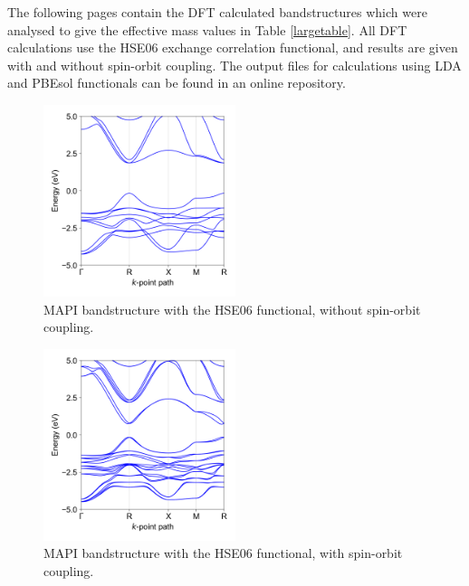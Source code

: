 The following pages contain the DFT calculated bandstructures which were analysed to give the effective mass values in Table \ref{largetable}. All DFT calculations use the HSE06 exchange correlation functional, and results  are given with and without spin-orbit coupling. The output files for calculations using LDA and PBEsol functionals can be found in an online repository.\autocite{Whalley2018b}

\begin{figure}[htb] \centering
\includegraphics[width=0.5\textwidth]{./figures/ap2/MAPI_hybrid.png}
\caption[MAPI bandstructure, HSE06, no-SoC]{MAPI bandstructure with the HSE06 functional, without spin-orbit coupling. }
\end{figure}

\begin{figure}[htb] \centering
\includegraphics[width=0.5\textwidth]{./figures/ap2/MAPI_hybrid_SoC.png}
\caption[MAPI bandstructure, HSE06, SoC]{MAPI bandstructure with the HSE06 functional, with spin-orbit coupling. }
\end{figure}

\clearpage

